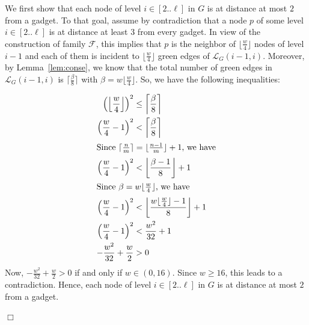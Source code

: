 \documentclass[11pt]{article}
\newcommand{\qed}{\hfill $\Box$ \bigbreak}
\newenvironment{proof}{\noindent {\bf Proof.}}{\qed}
\begin{document}
\begin{proof}
We first show that  each node of level $i \in [2..\ell]$ in $G$ is at distance at most $2$ from a gadget. To that goal, assume by contradiction that a node $p$ of some level $i \in [2..\ell]$ is at distance at least 3 from every gadget. In view of the construction of family $\mathcal{F}$, this implies that $p$ is the neighbor of $\lfloor\frac{w}{4}\rfloor$ nodes of level $i-1$ and each of them is incident to $\lfloor\frac{w}{4}\rfloor$ green edges of $\mathcal{L}_G(i-1,i)$. Moreover, by Lemma~\ref{lem:conse}, we know that the total number of green edges in $\mathcal{L}_G(i-1,i)$ is $\lceil\frac{\beta}{8}\rceil$ with $\beta=w\lfloor\frac{w}{4}\rfloor$. So, we have the following inequalities:

\begin{align*}
  \left(\left\lfloor\frac{w}{4}\right\rfloor\right)^2 & \leq \left\lceil\frac{\beta}{8}\right\rceil\\
\left(\frac{w}{4}-1\right)^2 & < \left\lceil\frac{\beta}{8}\right\rceil\\
\intertext{Since $\lceil\frac{n}{m}\rceil = \lfloor\frac{n-1}{m}\rfloor+1$, we have}
\left(\frac{w}{4}-1\right)^2 & < \left\lfloor\frac{\beta-1}{8}\right\rfloor+1\\
\intertext{Since $\beta=w\lfloor\frac{w}{4}\rfloor$, we have}
\left(\frac{w}{4}-1\right)^2 & < \left\lfloor\frac{w\lfloor\frac{w}{4}\rfloor-1}{8}\right\rfloor+1\\
\left(\frac{w}{4}-1\right)^2 & < \frac{w^2}{32}+1\\
-\frac{w^2}{32}+\frac{w}{2}  & > 0\\
\end{align*}
Now, $-\frac{w^2}{32}+\frac{w}{2} > 0$ if and only if $w \in (0,16)$. Since $w \geq 16$, this leads to a contradiction. Hence, each node of level $i \in [2..\ell]$ in $G$ is at distance at most $2$ from a gadget.
  

\end{proof}
\end{document}
